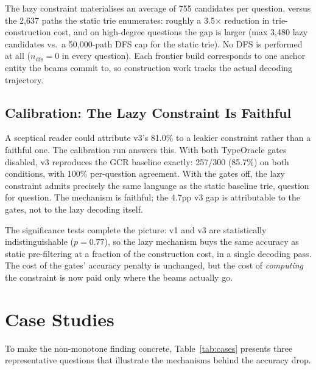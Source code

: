 The lazy constraint materialises an average of 755 candidates per question, versus the 2,637 paths the static trie enumerates: roughly a 3.5$\times$ reduction in trie-construction cost, and on high-degree questions the gap is larger (max 3,480 lazy candidates vs.\ a 50,000-path DFS cap for the static trie). No DFS is performed at all ($n_{\text{dfs}}=0$ in every question). Each frontier build corresponds to one anchor entity the beams commit to, so construction work tracks the actual decoding trajectory.

\subsection{Calibration: The Lazy Constraint Is Faithful}

A sceptical reader could attribute v3's 81.0\% to a leakier constraint rather than a faithful one. The calibration run answers this. With both TypeOracle gates disabled, v3 reproduces the GCR baseline exactly: 257/300 (85.7\%) on both conditions, with 100\% per-question agreement. With the gates off, the lazy constraint admits precisely the same language as the static baseline trie, question for question. The mechanism is faithful; the 4.7pp v3 gap is attributable to the gates, not to the lazy decoding itself.

The significance tests complete the picture: v1 and v3 are statistically indistinguishable ($p = 0.77$), so the lazy mechanism buys the same accuracy as static pre-filtering at a fraction of the construction cost, in a single decoding pass. The cost of the gates' accuracy penalty is unchanged, but the cost of \textit{computing} the constraint is now paid only where the beams actually go.

\section{Case Studies}
\label{sec:ch4cases}

To make the non-monotone finding concrete, Table~\ref{tab:cases} presents three representative questions that illustrate the mechanisms behind the accuracy drop.

